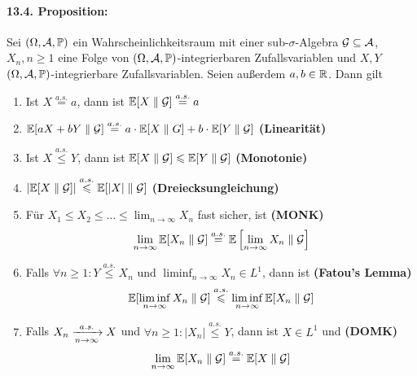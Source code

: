      \paragraph{13.4. Proposition:}Sei $(\Omega, \mathcal{A}, \mathbb{P})$ ein Wahrscheinlichkeitsraum mit einer sub-$\sigma$-Algebra $\mathcal{G}\subseteq\mathcal{A}$, $X_n,n\geq1$ eine Folge von $(\Omega, \mathcal{A}, \mathbb{P})$-integrierbaren Zufallsvariablen und $X,Y$ $(\Omega, \mathcal{A}, \mathbb{P})$-integrierbare Zufallsvariablen. Seien au\ss{}erdem $a,b\in\mathbb{R}$. Dann gilt
     \begin{enumerate}[label=(\roman*)]
         \item Ist $X\overset{a.s.}{=}a$, dann ist $\mathbb{E}[X\parallel \mathcal{G}]\overset{a.s.}{=}a$
         \item $\mathbb{E}[aX+bY\parallel\mathcal{G}]\overset{a.s.}{=}a\cdot\mathbb{E}[X\parallel G]+b\cdot\mathbb{E}[Y\parallel\mathcal{G}]$ \textbf{(Linearit\"at)}
         \item Ist $X\overset{a.s.}{\leq}Y$, dann ist $\mathbb{E}[X\parallel\mathcal{G}]\leqslant\mathbb{E}[Y\parallel\mathcal{G}]$ \textbf{(Monotonie)}
         \item $\left|\mathbb{E}[X\parallel\mathcal{G}]\right|\overset{a.s.}{\leqslant}\mathbb{E}[|X|\parallel\mathcal{G}]$ \textbf{(Dreiecksungleichung)}
         \item F\"ur $X_1\leq X_2\leq\hdots\leq\lim_{n\to\infty}X_n$ fast sicher, ist \textbf{(MONK)}
         $$\lim_{n\to\infty}\mathbb{E}[X_n\parallel\mathcal{G}]\overset{a.s.}{=}\mathbb{E}\left[\lim_{n\to\infty}X_n\parallel\mathcal{G}\right]$$
         \item Falls $\forall n\geq1:Y\overset{a.s.}{\leq} X_n$ und $\liminf_{n\to\infty}X_n\in L^1$, dann ist \textbf{(Fatou's Lemma)}
         $$\mathbb{E}[\liminf_{n\to\infty}X_n\parallel\mathcal{G}]\overset{a.s.}{\leqslant}\liminf_{n\to\infty}\mathbb{E}[X_n\parallel\mathcal{G}]$$
         \item Falls $X_n\nto{a.s.}{n\to\infty}X$ und $\forall n\geq1:|X_n|\overset{a.s.}{\leq}Y$, dann ist $X\in L^1$ und \textbf{(DOMK)}
         $$\lim_{n\to\infty}\mathbb{E}[X_n\parallel\mathcal{G}]\overset{a.s.}{=}\mathbb{E}[X\parallel\mathcal{G}]$$
     \end{enumerate}
     
